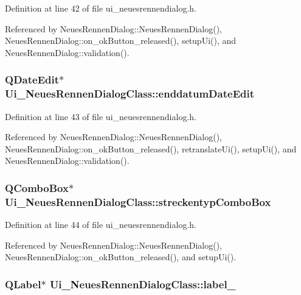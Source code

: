 Definition at line 42 of file ui\_\-neuesrennendialog.h.

Referenced by NeuesRennenDialog::NeuesRennenDialog(), NeuesRennenDialog::on\_\-okButton\_\-released(), setupUi(), and NeuesRennenDialog::validation().\hypertarget{class_ui___neues_rennen_dialog_class_e6e91b167041fc6cb41b36c94ffffada}{
\subsubsection[enddatumDateEdit]{\setlength{\rightskip}{0pt plus 5cm}QDateEdit$\ast$ {\bf Ui\_\-NeuesRennenDialogClass::enddatumDateEdit}}}
\label{class_ui___neues_rennen_dialog_class_e6e91b167041fc6cb41b36c94ffffada}




Definition at line 43 of file ui\_\-neuesrennendialog.h.

Referenced by NeuesRennenDialog::NeuesRennenDialog(), NeuesRennenDialog::on\_\-okButton\_\-released(), retranslateUi(), setupUi(), and NeuesRennenDialog::validation().\hypertarget{class_ui___neues_rennen_dialog_class_b904c89e6e1673d355f838a138d5ff77}{
\subsubsection[streckentypComboBox]{\setlength{\rightskip}{0pt plus 5cm}QComboBox$\ast$ {\bf Ui\_\-NeuesRennenDialogClass::streckentypComboBox}}}
\label{class_ui___neues_rennen_dialog_class_b904c89e6e1673d355f838a138d5ff77}




Definition at line 44 of file ui\_\-neuesrennendialog.h.

Referenced by NeuesRennenDialog::NeuesRennenDialog(), NeuesRennenDialog::on\_\-okButton\_\-released(), and setupUi().\hypertarget{class_ui___neues_rennen_dialog_class_2fe7543720c49cd2301d5eede3a99a46}{
\subsubsection[label\_\-5]{\setlength{\rightskip}{0pt plus 5cm}QLabel$\ast$ {\bf Ui\_\-NeuesRennenDialogClass::label\_}}}
\label{class_ui___neues_rennen_dialog_class_2fe7543720c49cd2301d5eede3a99a46}




